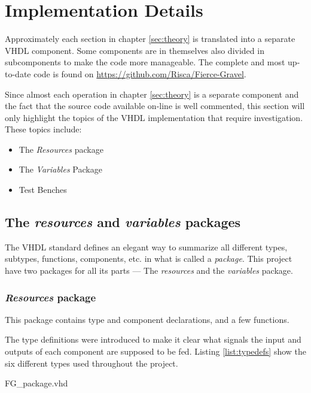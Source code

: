\documentclass[report.tex]{subfiles}
\begin{document}
\chapter{Implementation Details}
\label{chap:implementation details}
Approximately each section in chapter \ref{sec:theory} is translated into a separate VHDL component. Some components are in themselves also divided in subcomponents to make the code more manageable. The complete and most up-to-date code is found on \url{https://github.com/Risca/Fierce-Gravel}.

Since almost each operation in chapter \ref{sec:theory} is a separate component and the fact that the source code available on-line is well commented, this section will only highlight the topics of the VHDL implementation that require investigation. These topics include:

\begin{itemize}
\item The \emph{Resources} package
\item The \emph{Variables} Package
\item Test Benches
\end{itemize}

\section{The \emph{resources} and \emph{variables} packages}
The VHDL standard defines an elegant way to summarize all different types, subtypes, functions, components, etc. in what is called a \emph{package}. This project have two packages for all its parts --- The \emph{resources} and the \emph{variables} package.

\subsection{\emph{Resources} package}
This package contains type and component declarations, and a few functions.

The type definitions were introduced to make it clear what signals the input and outputs of each component are supposed to be fed.
Listing \ref{list:typedefs} show the six different types used throughout the project.


{FG_package.vhd}
\end{document}
